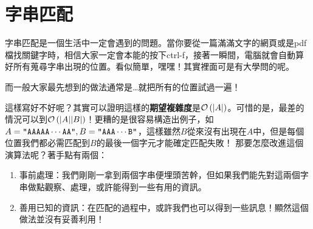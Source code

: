 \documentclass[a4paper,12pt]{book}
\begin{document}
\section{字串匹配}
  字串匹配是一個生活中一定會遇到的問題。當你要從一篇滿滿文字的網頁或是pdf檔找關鍵字時，相信大家一定會本能的按下ctrl-f，接著一瞬間，電腦就會自動算好所有蒐尋字串出現的位置。看似簡單，嘿嘿！其實裡面可是有大學問的呢。


而一般大家最先想到的做法通常是…就把所有的位置試過一遍！ 

這樣寫好不好呢？其實可以證明這樣的{\bf 期望複雜度}是$\operatorname{\mathcal{O}}\left(\lvert A \rvert\right)$。可惜的是，最差的情況可以到$\operatorname{\mathcal{O}}\left(\lvert A \rvert\lvert B \rvert\right)$！更糟的是很容易構造出例子，如$A = \texttt{"AAAAA}\cdots\texttt{AA"}, B = \texttt{"AAA}\cdots\texttt{B"}$，這樣雖然$B$從來沒有出現在$A$中，但是每個位置我們都必需匹配到$B$的最後一個字元才能確定匹配失敗！
那要怎麼改進這個演算法呢？著手點有兩個：
\begin{enumerate}
  \item 事前處理：我們剛剛一拿到兩個字串便埋頭苦幹，但如果我們能先對這兩個字串做點觀察、處理，或許能得到一些有用的資訊。
  \item 善用已知的資訊：在匹配的過程中，或許我們也可以得到一些訊息！顯然這個做法並沒有妥善利用！
\end{enumerate}
\end{document}
